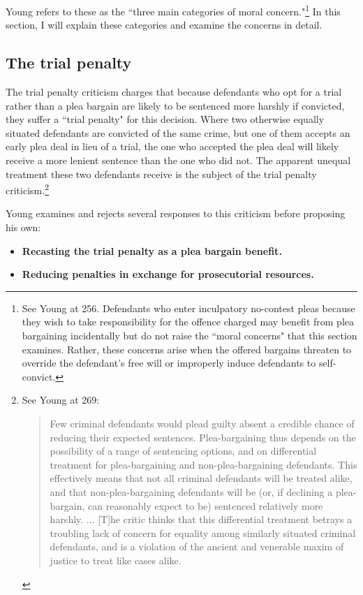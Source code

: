 Young refers to these as the ``three main categories of moral concern."\footnote{See Young at 256. Defendants who enter inculpatory no-contest pleas because they wish to take responsibility for the offence charged may benefit from plea bargaining incidentally but do not raise the ``moral concerns" that this section examines. Rather, these concerns arise when the offered bargains threaten to override the defendant's free will or improperly induce defendants to self-convict.} In this section, I will explain these categories and examine the concerns in detail. 

\subsection{The trial penalty}

The trial penalty criticism charges that because defendants who opt for a trial rather than a plea bargain are likely to be sentenced more harshly if convicted, they suffer a ``trial penalty" for this decision. Where two otherwise equally situated defendants are convicted of the same crime, but one of them accepts an early plea deal in lieu of a trial, the one who accepted the plea deal will likely receive a more lenient sentence than the one who did not. The apparent unequal treatment these two defendants receive is the subject of the trial penalty criticism.\footnote{See Young at 269: 
\begin{quote}
    Few criminal defendants would plead guilty absent a credible chance of reducing their expected sentences. Plea-bargaining thus depends on the possibility of a range of sentencing options, and on differential treatment for plea-bargaining and non-plea-bargaining defendants. This effectively means that not all criminal defendants will be treated alike, and that non-plea-bargaining defendants will be (or, if declining a plea-bargain, can reasonably expect to be) sentenced relatively more harshly. ... [T]he critic thinks that this differential treatment betrays a troubling lack of concern for equality among similarly situated criminal defendants, and is a violation of the ancient and venerable maxim of justice to treat like cases alike.
\end{quote}}

Young examines and rejects several responses to this criticism before proposing his own:

\begin{itemize}
    \item \textbf{Recasting the trial penalty as a plea bargain benefit.} 
    \item \textbf{Reducing penalties in exchange for prosecutorial resources.}
\end{itemize}

